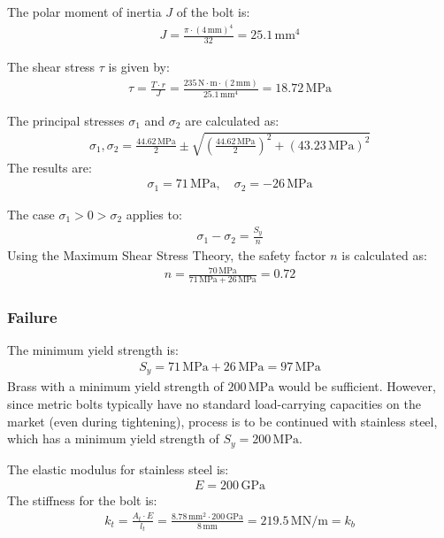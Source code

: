 \documentclass[12pt]{report}
\begin{document}
The polar moment of inertia \( J \) of the bolt is:
\begin{align}
J = \frac{\pi \cdot (4 \, \text{mm})^4}{32} = 25.1 \, \text{mm}^4
\end{align}

The shear stress \( \tau \) is given by:
\begin{align}
\tau = \frac{T \cdot r}{J} = \frac{235 \, \text{N} \cdot \text{m} \cdot (2 \, \text{mm})}{25.1 \, \text{mm}^4} = 18.72 \, \text{MPa}
\end{align}

The principal stresses \( \sigma_1 \) and \( \sigma_2 \) are calculated as:
\begin{align}
\sigma_1, \sigma_2 = \frac{44.62 \, \text{MPa}}{2} \pm \sqrt{\left( \frac{44.62 \, \text{MPa}}{2} \right)^2 + (43.23 \, \text{MPa})^2}
\end{align}
The results are:
\begin{align}
\sigma_1 = 71 \, \text{MPa}, \quad \sigma_2 = -26 \, \text{MPa}
\end{align}

The case \( \sigma_1 > 0 > \sigma_2 \) applies to:
\begin{align}
\sigma_1 - \sigma_2 = \frac{S_y}{n}
\end{align}
Using the Maximum Shear Stress Theory, the safety factor \( n \) is calculated as:
\begin{align}
n = \frac{70 \, \text{MPa}}{71 \, \text{MPa} + 26 \, \text{MPa}} = 0.72
\end{align}


\subsubsection{Failure}

The minimum yield strength is:
\begin{align}
S_y = 71 \, \text{MPa} + 26 \, \text{MPa} = 97 \, \text{MPa}
\end{align}
Brass with a minimum yield strength of \( 200 \, \text{MPa} \) would be sufficient. However, since metric bolts typically have no standard load-carrying capacities on the market (even during tightening), process is to be continued with stainless steel, which has a minimum yield strength of \( S_y = 200 \, \text{MPa} \).

The elastic modulus for stainless steel is:
\begin{align}
E = 200 \, \text{GPa}
\end{align}
The stiffness for the bolt is:
\begin{align}
k_t = \frac{A_t \cdot E}{l_t} = \frac{8.78 \, \text{mm}^2 \cdot 200 \, \text{GPa}}{8 \, \text{mm}} = 219.5 \, \text{MN/m} = k_b
\end{align}
\end{document}
